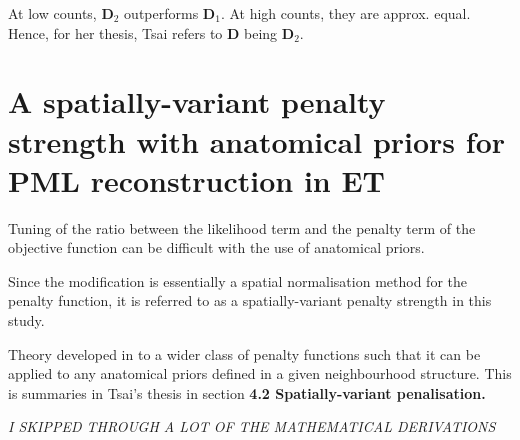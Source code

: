 \documentclass{article}
\begin{document}
At low counts, $\textbf{D}_2$ outperforms $\textbf{D}_1$. At high counts, they are approx. equal. Hence, for her thesis, Tsai refers to $\textbf{D}$ being $\textbf{D}_2$.




\newpage
\section{A spatially-variant penalty strength with anatomical priors for PML reconstruction in ET}

Tuning of the ratio between the likelihood term and the penalty term of the objective function can be difficult with the use of anatomical priors.

Since the modification is essentially a spatial normalisation method for the penalty function, it is referred to as a spatially-variant penalty strength in this study.

Theory developed in \cite{SangtaeAhn2008AnalysisPET} to a wider class of penalty functions such that it can be applied to any anatomical priors defined in a given neighbourhood structure. This is summaries in Tsai's thesis in section \textbf{4.2 Spatially-variant penalisation.}



\textit{I SKIPPED THROUGH A LOT OF THE MATHEMATICAL DERIVATIONS}





\newpage

 

\end{document}
